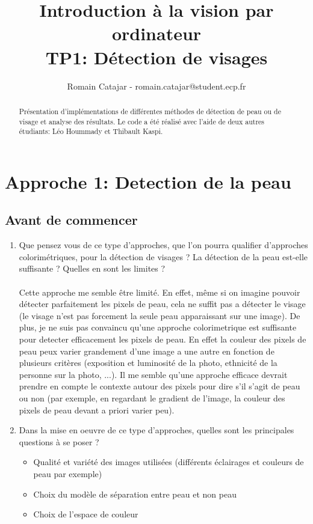 \documentclass{article}
\begin{document}
\title{Introduction à la vision par ordinateur \\
TP1: Détection de visages}
\author{Romain Catajar - romain.catajar@student.ecp.fr}
\maketitle

\begin{abstract}
Présentation d'implémentations de différentes méthodes de détection de peau ou de visage et analyse des résultats. Le code a été réalisé avec l'aide de deux autres étudiants: Léo Hoummady et Thibault Kaspi.
\end{abstract}
\section{Approche 1: Detection de la peau}
\subsection{Avant de commencer}
\begin{enumerate}
    \item Que pensez vous de ce type d'approches, que l'on pourra qualifier
d'approches colorimétriques, pour la détection de visages ? La détection
de la peau est-elle suffisante ? Quelles en sont les limites ?\\\\
Cette approche me semble être limité. En effet, même si on imagine pouvoir détecter parfaitement les pixels de peau, cela ne suffit pas a détecter le visage (le visage n'est pas forcement la seule peau apparaissant sur une image). De plus, je ne suis pas convaincu qu'une approche colorimetrique est suffisante pour detecter efficacement les pixels de peau. En effet la couleur des pixels de peau peux varier grandement d'une image a une autre en fonction de plusieurs critères (exposition et luminosité de la photo, ethnicité de la personne sur la photo, ...). Il me semble qu'une approche efficace devrait prendre en compte le contexte autour des pixels pour dire s'il s'agit de peau ou non (par exemple, en regardant le gradient de l'image, la couleur des pixels de peau devant a priori varier peu).\\

    \item Dans la mise en oeuvre de ce type d'approches, quelles sont les principales questions à se poser ? \\
    \begin{itemize}
        \item Qualité et variété des images utilisées (différents éclairages et couleurs de peau par exemple)
        \item Choix du modèle de séparation entre peau et non peau
        \item Choix de l'espace de couleur
    \end{itemize}
\end{enumerate}
\end{document}
